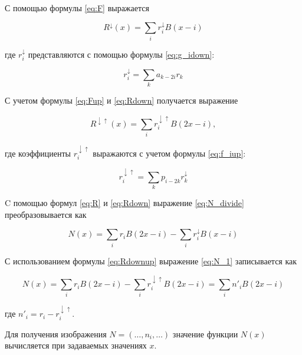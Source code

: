 С помощью формулы \ref{eq:F} выражается

\begin{equation}\label{eq:Rdown}
	R^{\downarrow}(x)=\sum_{i}r_{i}^{\downarrow}B(x-i)
\end{equation}

где $r_{i}^{\downarrow}$ представляются с помощью формулы \ref{eq:g_idown}:

\begin{equation}\label{eq:r_idown}
	r_i^{\downarrow}=\sum_{k}a_{k-2i}r_k
\end{equation}


С учетом формулы \ref{eq:Fup} и \ref{eq:Rdown} получается выражение

\begin{equation}\label{eq:Rdownup}
	R^{\downarrow\uparrow}(x)=\sum_{i}r_{i}^{\downarrow\uparrow}B(2x-i),
\end{equation}

где коэффициенты $r_{i}^{\downarrow\uparrow}$ выражаются с учетом формулы \ref{eq:f_iup}:

\begin{equation}\label{eq:r_idownup}
	r_i^{\downarrow\uparrow}=\sum_{k}p_{i-2k}r_k^{\downarrow}
\end{equation}


C помощью формул \ref{eq:R} и \ref{eq:Rdown} выражение \ref{eq:N_divide} преобразовывается как

\begin{equation}\label{eq:N_1}
	N(x)=\sum_{i}r_{i}B(2x-i)-\sum_{i}r_{i}^{\downarrow}B(x-i)
\end{equation}

С использованием формулы \ref{eq:Rdownup} выражение \ref{eq:N_1} записывается как

\begin{equation}\label{eq:N}
	N(x)=\sum_{i}r_{i}B(2x-i)-\sum_{i}r_{i}^{\downarrow\uparrow}B(2x-i)=\sum_{i}n'_{i}B(2x-i)
\end{equation}

где $n'_i=r_i-r_i^{\downarrow\uparrow}$.

Для получения изображения $N=(\dots,n_i,\dots)$ значение функции $N(x)$ вычисляется при задаваемых значениях $x$.